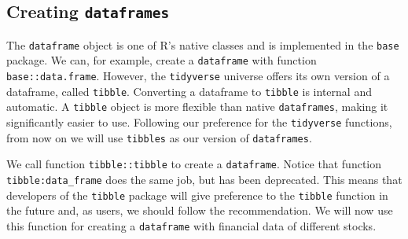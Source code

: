 \documentclass[
  12pt,
]{book}
\begin{document}
\hypertarget{creating-dataframes}{%
\subsection{\texorpdfstring{Creating \texttt{dataframes}}{Creating dataframes}}\label{creating-dataframes}}

The \texttt{dataframe} object is one of R's native classes and is implemented in the \texttt{base} package. We can, for example, create a \texttt{dataframe} with function \texttt{base::data.frame}. However, the \texttt{tidyverse} universe offers its own version of a dataframe, called \texttt{tibble}. Converting a dataframe to \texttt{tibble} is internal and automatic. A \texttt{tibble} object is more flexible than native \texttt{dataframes}, making it significantly easier to use. Following our preference for the \texttt{tidyverse} functions, from now on we will use \texttt{tibbles} as our version of \texttt{dataframes}. 

We call function \texttt{tibble::tibble} to create a \texttt{dataframe}. Notice that function \texttt{tibble:data\_frame} does the same job, but has been deprecated. This means that developers of the \texttt{tibble} package will give preference to the \texttt{tibble} function in the future and, as users, we should follow the recommendation. We will now use this function for creating a \texttt{dataframe} with financial data of different stocks.   
\end{document}

